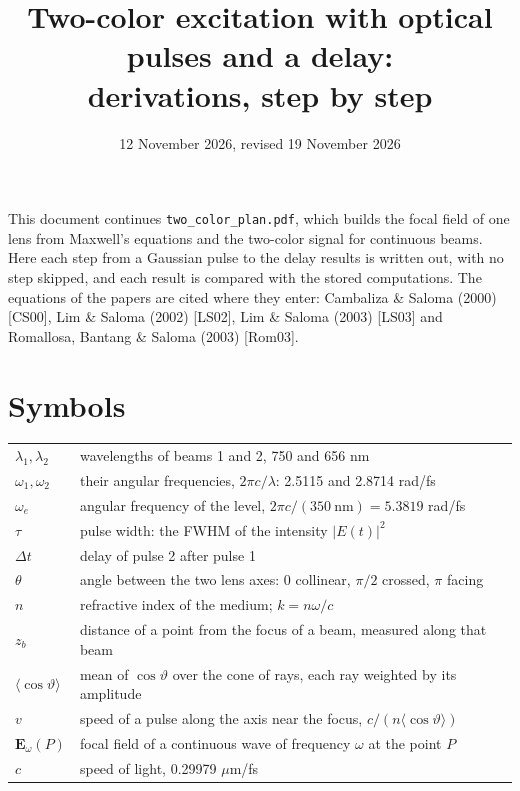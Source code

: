 \documentclass[11pt]{article}
\title{Two-color excitation with optical pulses and a delay:\\ derivations, step by step}
\date{12 November 2026, revised 19 November 2026}
\author{}
\begin{document}
\maketitle
\vspace{-2.5em}

This document continues \texttt{two\_color\_plan.pdf}, which builds the focal field of one lens from Maxwell's
equations and the two-color signal for continuous beams. Here each step from a Gaussian pulse to the delay
results is written out, with no step skipped, and each result is compared with the stored computations. The
equations of the papers are cited where they enter: Cambaliza \& Saloma (2000) [CS00], Lim \& Saloma (2002) [LS02],
Lim \& Saloma (2003) [LS03] and Romallosa, Bantang \& Saloma (2003) [Rom03].

\section*{Symbols}
\begin{center}\small\begin{tabular}{ll}\toprule
$\lambda_1, \lambda_2$ & wavelengths of beams 1 and 2, 750 and 656 nm\\
$\omega_1, \omega_2$ & their angular frequencies, $2\pi c/\lambda$: 2.5115 and 2.8714 rad/fs\\
$\omega_e$ & angular frequency of the level, $2\pi c/(350\ \mathrm{nm}) = 5.3819$ rad/fs\\
$\tau$ & pulse width: the FWHM of the intensity $|E(t)|^2$\\
$\Delta t$ & delay of pulse 2 after pulse 1\\
$\theta$ & angle between the two lens axes: 0 collinear, $\pi/2$ crossed, $\pi$ facing\\
$n$ & refractive index of the medium; $k = n\omega/c$\\
$z_b$ & distance of a point from the focus of a beam, measured along that beam\\
$\langle\cos\vartheta\rangle$ & mean of $\cos\vartheta$ over the cone of rays, each ray weighted by its amplitude\\
$v$ & speed of a pulse along the axis near the focus, $c/(n\langle\cos\vartheta\rangle)$\\
$\mathbf{E}_\omega(P)$ & focal field of a continuous wave of frequency $\omega$ at the point $P$\\
$c$ & speed of light, 0.29979 $\mu$m/fs\\\bottomrule\end{tabular}\end{center}
\end{document}
